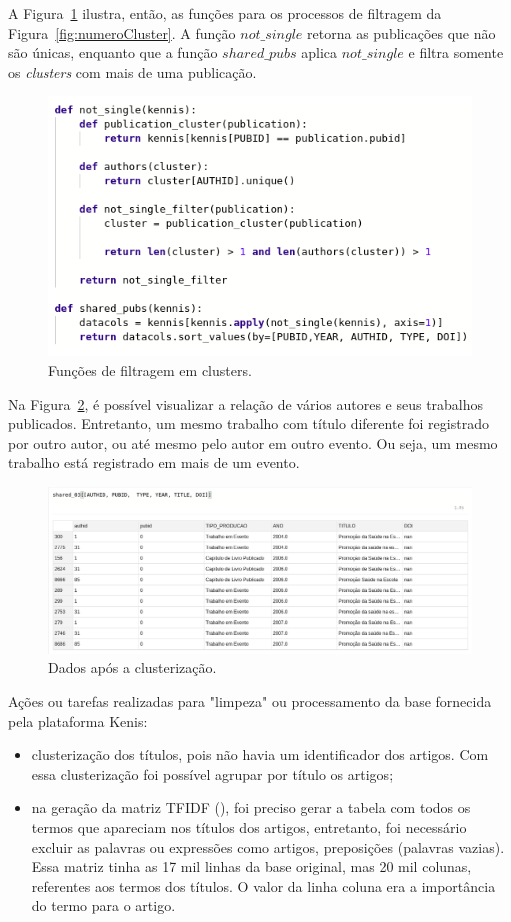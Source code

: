 \documentclass[12pt]{article}
\begin{document}
A Figura~\ref{fig:codigoFiltragem} ilustra, então, as funções para os processos de filtragem da Figura~\ref{fig:numeroCluster}. A função $not\_single$ retorna as publicações que não são únicas, enquanto que a função $shared\_pubs$ aplica $not\_single$ e filtra somente os \textit{clusters} com mais de uma publicação.

\begin{figure}[ht]
\centering
  \includegraphics[width=.8\textwidth]{shared-pubs.png}
  \caption{Funções de filtragem em clusters.}
  \label{fig:codigoFiltragem}
\end{figure}

Na Figura~\ref{fig:dadosAposClusterizacao}, é possível visualizar a relação de vários autores e seus trabalhos publicados. Entretanto, um mesmo trabalho com título diferente foi registrado por outro autor, ou até mesmo pelo autor em outro evento. Ou seja, um mesmo trabalho está registrado em mais de um evento.

\begin{figure}[ht]
\centering
  \includegraphics[width=1\textwidth]{shared-03.png}
  \caption{Dados após a clusterização.}
  \label{fig:dadosAposClusterizacao}
\end{figure}

Ações ou tarefas realizadas para "limpeza" ou processamento da base fornecida pela plataforma Kenis:
\begin{itemize}
    \item clusterização dos títulos, pois não havia um identificador dos artigos. Com essa clusterização foi possível agrupar por título os artigos;
    \item na geração da matriz TFIDF (), foi preciso gerar a tabela com todos os termos que apareciam nos títulos dos artigos, entretanto, foi necessário excluir as palavras ou expressões como artigos, preposições (palavras vazias). Essa matriz tinha as 17 mil linhas da base original, mas 20 mil colunas, referentes aos termos dos títulos. O valor da linha coluna era a importância do termo para o artigo.
\end{itemize}{}
\end{document}
